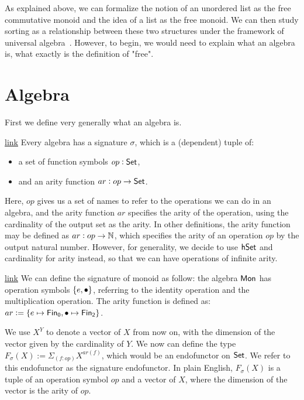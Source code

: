\label{sec:universal-algebra}

As explained above, we can formalize the notion of an unordered list
as the free commutative monoid and the idea of a list as the free
monoid. We can then study sorting as a relationship between these
two structures under the framework of universal algebra~\cite{birkhoffStructureAbstractAlgebras1935}.
However, to begin, we would need to explain what an algebra is,
what exactly is the definition of "free".

\section{Algebra}\label{algebra:signature}
First we define very generally what an algebra is.
\begin{definition}{\href{https://windtfw.com/agda-symmetries/Cubical.Structures.Sig.html#572}{link}}
Every algebra has a signature $\sigma$, which is a (dependent) tuple of:
\begin{itemize}
    \item a set of function symbols $op : \mathsf{Set}$,
    \item and an arity function $ar : op \to \mathsf{Set}$.
\end{itemize}
\end{definition}

Here, $op$ gives us a set of names to refer to the operations we can do
in an algebra, and the arity function $ar$ specifies the arity of the operation,
using the cardinality of the output set as the arity. In other definitions,
the arity function may be defined as $ar : op \to \mathbb{N}$, which specifies
the arity of an operation $op$ by the output natural number. However,
for generality, we decide to use $\mathsf{hSet}$ and cardinality for arity instead,
so that we can have operations of infinite arity. 

\begin{example}{\href{https://windtfw.com/agda-symmetries/Cubical.Structures.Set.Mon.Desc.html#600}{link}}
We can define the signature of monoid as follow: the algebra $\mathsf{Mon}$
has operation symbols $\{ e, \mathbin{\bullet} \}$, referring to the identity operation
and the multiplication operation. The arity function is defined as:
$ar := \{ e \mapsto \Fin[0], \mult \mapsto \Fin[2] \}$.
\end{example}

We use $X^Y$ to denote a vector of $X$ from now on, with the dimension of
the vector given by the cardinality of $Y$. We now can define the type
$F_\sigma(X) := \Sigma_{(f: op)}X^{ar(f)}$, which would be an endofunctor
on $\mathsf{Set}$. We refer to this endofunctor as the signature endofunctor.
In plain English, $F_\sigma(X)$ is a tuple of an operation symbol $op$
and a vector of $X$, where the dimension of the vector is the arity of $op$.

